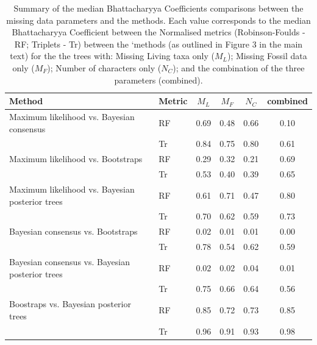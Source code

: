 \documentclass[12pt,letterpaper]{article}
\begin{document}
\begin{table}[ht]
\caption{Summary of the median Bhattacharyya Coefficients comparisons between the missing data parameters and the methods. Each value corresponds to the median Bhattacharyya Coefficient between the Normalised metrics (Robinson-Foulds - RF; Triplets - Tr) between the `methods (as outlined in Figure 3 in the main text) for the the trees with: Missing Living taxa only ($M_L$); Missing Fossil data only ($M_F$); Number of characters only ($N_C$); and the combination of the three parameters (combined).}
\begin{tabular}{llcccc}  
  \hline
 Method & Metric & $M_L$ & $M_F$ & $N_C$ & combined \\ 
  \hline
Maximum likelihood vs. Bayesian consensus & RF & 0.69 & 0.48 & 0.66 & 0.10 \\ 
   & Tr & 0.84 & 0.75 & 0.80 & 0.61 \\ 
Maximum likelihood vs. Bootstraps & RF & 0.29 & 0.32 & 0.21 & 0.69 \\ 
   & Tr & 0.53 & 0.40 & 0.39 & 0.65 \\ 
Maximum likelihood vs. Bayesian posterior trees & RF & 0.61 & 0.71 & 0.47 & 0.80 \\ 
  & Tr & 0.70 & 0.62 & 0.59 & 0.73 \\ 
Bayesian consensus vs. Bootstraps & RF & 0.02 & 0.01 & 0.01 & 0.00 \\ 
  & Tr & 0.78 & 0.54 & 0.62 & 0.59 \\ 
Bayesian consensus vs. Bayesian posterior trees & RF & 0.02 & 0.02 & 0.04 & 0.01 \\ 
   & Tr & 0.75 & 0.66 & 0.64 & 0.56 \\ 
Boostraps vs. Bayesian posterior trees & RF & 0.85 & 0.72 & 0.73 & 0.85 \\ 
   & Tr & 0.96 & 0.91 & 0.93 & 0.98 \\ 
 \hline
\end{tabular}
\end{table}
\end{document}
